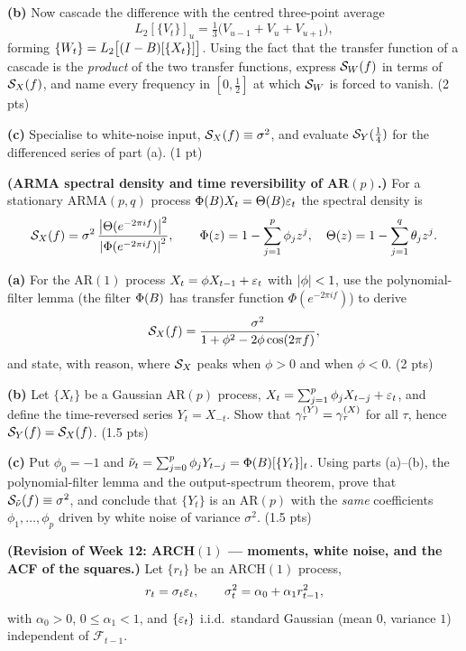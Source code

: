 \documentclass[11pt]{article}
\newcommand{\filt}{L}
\begin{document}
\textbf{(b)} Now cascade the difference with the centred three-point average
\[
\filt_2[\{V_t\}]_u=\tfrac13\bigl(V_{u-1}+V_u+V_{u+1}\bigr),
\]
forming $\{W_t\}=\filt_2\bigl[(I-\Bsh)[\{X_t\}]\bigr]$. Using the fact that the transfer function of a cascade is the \emph{product} of the two transfer functions, express $\mathcal{S}_W(f)$ in terms of $\mathcal{S}_X(f)$, and name every frequency in $[0,\tfrac12]$ at which $\mathcal{S}_W$ is forced to vanish. \hfill(2 pts)

\textbf{(c)} Specialise to white-noise input, $\mathcal{S}_X(f)\equiv\sigma^2$, and evaluate $\mathcal{S}_Y(\tfrac14)$ for the differenced series of part (a). \hfill(1 pt)
\answerpage

\textbf{(ARMA spectral density and time reversibility of AR$(p)$.)} For a stationary $\mathrm{ARMA}(p,q)$ process $\Phi(B)X_t=\Theta(B)\varepsilon_t$ the spectral density is
\[
\mathcal{S}_X(f)=\sigma^2\,\frac{\left\lvert \Theta(e^{-2\pi i f}) \right\rvert^2}{\left\lvert \Phi(e^{-2\pi i f}) \right\rvert^2},
\qquad
\Phi(z)=1-\sum_{j=1}^p\phi_j z^j,\quad \Theta(z)=1-\sum_{j=1}^q\theta_j z^j .
\]

\textbf{(a)} For the AR$(1)$ process $X_t=\phi X_{t-1}+\varepsilon_t$ with $\left\lvert \phi \right\rvert<1$, use the polynomial-filter lemma (the filter $\Phi(B)$ has transfer function $\Phi(e^{-2\pi i f})$) to derive
\[
\mathcal{S}_X(f)=\frac{\sigma^2}{1+\phi^2-2\phi\cos(2\pi f)} ,
\]
and state, with reason, where $\mathcal{S}_X$ peaks when $\phi>0$ and when $\phi<0$. \hfill(2 pts)

\textbf{(b)} Let $\{X_t\}$ be a Gaussian AR$(p)$ process, $X_t=\sum_{j=1}^p\phi_j X_{t-j}+\varepsilon_t$, and define the time-reversed series $Y_t=X_{-t}$. Show that $\gamma^{(Y)}_\tau=\gamma^{(X)}_\tau$ for all $\tau$, hence $\mathcal{S}_Y(f)=\mathcal{S}_X(f)$. \hfill(1.5 pts)

\textbf{(c)} Put $\phi_0=-1$ and $\tilde\nu_t=\sum_{j=0}^p\phi_j Y_{t-j}=\Phi(B)[\{Y_t\}]_t$. Using parts (a)--(b), the polynomial-filter lemma and the output-spectrum theorem, prove that $\mathcal{S}_{\tilde\nu}(f)\equiv\sigma^2$, and conclude that $\{Y_t\}$ is an AR$(p)$ with the \emph{same} coefficients $\phi_1,\dots,\phi_p$ driven by white noise of variance $\sigma^2$. \hfill(1.5 pts)
\answerpage

\textbf{(Revision of Week 12: ARCH$(1)$ --- moments, white noise, and the ACF of the squares.)} Let $\{r_t\}$ be an $\mathrm{ARCH}(1)$ process,
\[
r_t=\sigma_t\varepsilon_t,\qquad \sigma_t^2=\alpha_0+\alpha_1 r_{t-1}^2,
\]
with $\alpha_0>0$, $0\le\alpha_1<1$, and $\{\varepsilon_t\}$ i.i.d.\ standard Gaussian (mean $0$, variance $1$) independent of $\mathcal F_{t-1}$.
\end{document}
